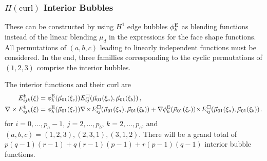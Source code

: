 \subsubsection{\texorpdfstring{$H(\mathrm{curl})$}{Hcurl} Interior Bubbles}

These can be constructed by using $H^1$ edge bubbles $\phi_k^{\mathrm{E}}$ as blending functions instead of the linear blending $\mu_d$ in the expressions for the face shape functions.
All permutations of $(a,b,c)$ leading to linearly independent functions must be considered.
In the end, three famillies corresponding to the cyclic permutations of $(1,2,3)$ comprise the interior bubbles.

The interior functions and their curl are
\begin{equation}
	\begin{aligned}
		E_{ijk}^\mathrm{b}(\xi)&=\phi_k^{\mathrm{E}}(\vec{\mu}_{01}(\xi_c))E_{ij}^\square(\vec{\mu}_{01}(\xi_a),\vec{\mu}_{01}(\xi_b))\,,\\
		\nabla\times E_{ijk}^\mathrm{b}(\xi)&=\phi_k^{\mathrm{E}}(\vec{\mu}_{01}(\xi_c))\nabla\!\times\!
			E_{ij}^\square(\vec{\mu}_{01}(\xi_a),\vec{\mu}_{01}(\xi_b))
				+\nabla\phi_k^{\mathrm{E}}(\vec{\mu}_{01}(\xi_c))\!\times\! E_{ij}^\square(\vec{\mu}_{01}(\xi_a),\vec{\mu}_{01}(\xi_b))\,.
	\end{aligned}
\end{equation}
for $i=0,\ldots,p_a-1$, $j=2,\ldots,p_b$, $k=2,\ldots,p_c$, and $(a,b,c)=(1,2,3),(2,3,1),(3,1,2)$.
There will be a grand total of $p(q-1)(r-1)+q(r-1)(p-1)+r(p-1)(q-1)$ interior bubble functions.

